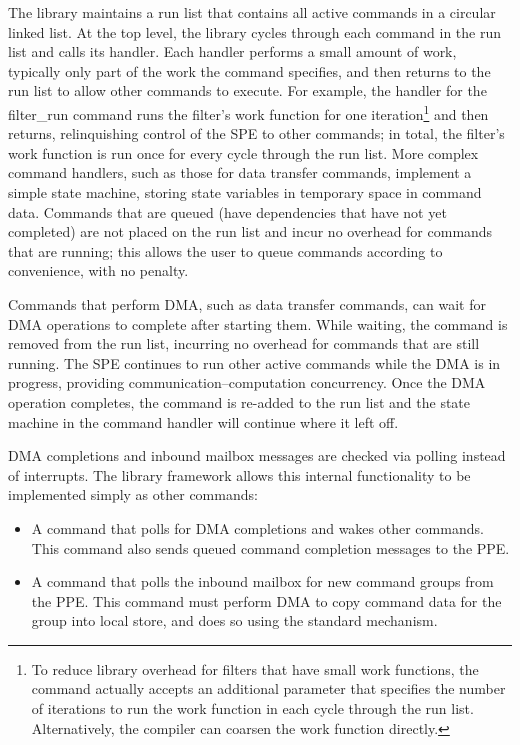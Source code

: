 The library maintains a run list that contains all active commands in a circular linked list. At the top level, the library cycles through each command in the run list and calls its handler. Each handler performs a small amount of work, typically only part of the work the command specifies, and then returns to the run list to allow other commands to execute. For example, the handler for the \textsf{filter\_run} command runs the filter's work function for one iteration\footnote{To reduce library overhead for filters that have small work functions, the command actually accepts an additional parameter that specifies the number of iterations to run the work function in each cycle through the run list. Alternatively, the compiler can coarsen the work function directly.} and then returns, relinquishing control of the SPE to other commands; in total, the filter's work function is run once for every cycle through the run list. More complex command handlers, such as those for data transfer commands, implement a simple state machine, storing state variables in temporary space in command data. Commands that are queued (have dependencies that have not yet completed) are not placed on the run list and incur no overhead for commands that are running; this allows the user to queue commands according to convenience, with no penalty.

Commands that perform DMA, such as data transfer commands, can wait for DMA operations to complete after starting them. While waiting, the command is removed from the run list, incurring no overhead for commands that are still running. The SPE continues to run other active commands while the DMA is in progress, providing communication--computation concurrency. Once the DMA operation completes, the command is re-added to the run list and the state machine in the command handler will continue where it left off.

DMA completions and inbound mailbox messages are checked via polling instead of interrupts. The library framework allows this internal functionality to be implemented simply as other commands:
\begin{itemize}
\item A command that polls for DMA completions and wakes other commands. This command also sends queued command completion messages to the PPE.
\item A command that polls the inbound mailbox for new command groups from the PPE. This command must perform DMA to copy command data for the group into local store, and does so using the standard mechanism.
\end{itemize}

